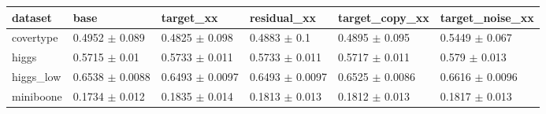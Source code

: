 \begin{tabular}{llllll}
\toprule
dataset & base & target\_xx & residual\_xx & target\_copy\_xx & target\_noise\_xx \\
\midrule
covertype & 0.4952 $\pm$ 0.089 & 0.4825 $\pm$ 0.098 & 0.4883 $\pm$ 0.1 & 0.4895 $\pm$ 0.095 & 0.5449 $\pm$ 0.067 \\
higgs & 0.5715 $\pm$ 0.01 & 0.5733 $\pm$ 0.011 & 0.5733 $\pm$ 0.011 & 0.5717 $\pm$ 0.011 & 0.579 $\pm$ 0.013 \\
higgs\_low & 0.6538 $\pm$ 0.0088 & 0.6493 $\pm$ 0.0097 & 0.6493 $\pm$ 0.0097 & 0.6525 $\pm$ 0.0086 & 0.6616 $\pm$ 0.0096 \\
miniboone & 0.1734 $\pm$ 0.012 & 0.1835 $\pm$ 0.014 & 0.1813 $\pm$ 0.013 & 0.1812 $\pm$ 0.013 & 0.1817 $\pm$ 0.013 \\
\bottomrule
\end{tabular}
